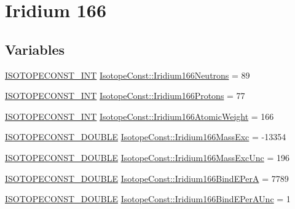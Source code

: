 \hypertarget{group___isotope_const-_iridium-_ir166}{}\section{Iridium 166}
\label{group___isotope_const-_iridium-_ir166}
\subsection*{Variables}
\begin{DoxyCompactItemize}
\item 
\mbox{\hyperlink{group___isotope_const-_macros_ga5f18360b3e99483a35c32d789e62621c}{I\+S\+O\+T\+O\+P\+E\+C\+O\+N\+S\+T\+\_\+\+I\+NT}} \mbox{\hyperlink{group___isotope_const-_iridium-_ir166_gafb732e05754b42de4b408d5a900c5162}{Isotope\+Const\+::\+Iridium166\+Neutrons}} = 89
\item 
\mbox{\hyperlink{group___isotope_const-_macros_ga5f18360b3e99483a35c32d789e62621c}{I\+S\+O\+T\+O\+P\+E\+C\+O\+N\+S\+T\+\_\+\+I\+NT}} \mbox{\hyperlink{group___isotope_const-_iridium-_ir166_ga27e73435479f7d939e48a565a523d02d}{Isotope\+Const\+::\+Iridium166\+Protons}} = 77
\item 
\mbox{\hyperlink{group___isotope_const-_macros_ga5f18360b3e99483a35c32d789e62621c}{I\+S\+O\+T\+O\+P\+E\+C\+O\+N\+S\+T\+\_\+\+I\+NT}} \mbox{\hyperlink{group___isotope_const-_iridium-_ir166_gab515c42345034dd6536e4ae90d27a80a}{Isotope\+Const\+::\+Iridium166\+Atomic\+Weight}} = 166
\item 
\mbox{\hyperlink{group___isotope_const-_macros_ga8f45a7272ce02c0b4c65c44636ed719a}{I\+S\+O\+T\+O\+P\+E\+C\+O\+N\+S\+T\+\_\+\+D\+O\+U\+B\+LE}} \mbox{\hyperlink{group___isotope_const-_iridium-_ir166_gacaeadd701a5b8f15d6abbfcaf42672c8}{Isotope\+Const\+::\+Iridium166\+Mass\+Exc}} = -\/13354
\item 
\mbox{\hyperlink{group___isotope_const-_macros_ga8f45a7272ce02c0b4c65c44636ed719a}{I\+S\+O\+T\+O\+P\+E\+C\+O\+N\+S\+T\+\_\+\+D\+O\+U\+B\+LE}} \mbox{\hyperlink{group___isotope_const-_iridium-_ir166_ga2327379bc8d497e337a7560f09c15271}{Isotope\+Const\+::\+Iridium166\+Mass\+Exc\+Unc}} = 196
\item 
\mbox{\hyperlink{group___isotope_const-_macros_ga8f45a7272ce02c0b4c65c44636ed719a}{I\+S\+O\+T\+O\+P\+E\+C\+O\+N\+S\+T\+\_\+\+D\+O\+U\+B\+LE}} \mbox{\hyperlink{group___isotope_const-_iridium-_ir166_ga0f9a3e83230c6d476282966e557dd6ad}{Isotope\+Const\+::\+Iridium166\+Bind\+E\+PerA}} = 7789
\item 
\mbox{\hyperlink{group___isotope_const-_macros_ga8f45a7272ce02c0b4c65c44636ed719a}{I\+S\+O\+T\+O\+P\+E\+C\+O\+N\+S\+T\+\_\+\+D\+O\+U\+B\+LE}} \mbox{\hyperlink{group___isotope_const-_iridium-_ir166_gaca257279b0aa5fbc72816d59572f5baa}{Isotope\+Const\+::\+Iridium166\+Bind\+E\+Per\+A\+Unc}} = 1

\end{DoxyCompactItemize}
